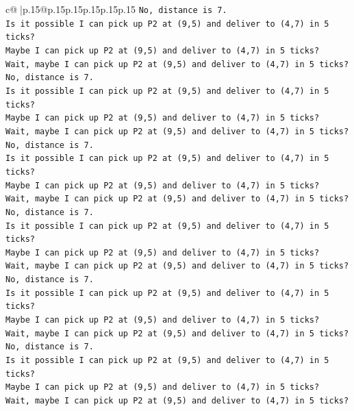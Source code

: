 \documentclass{article}
\begin{document}
{\begin{supertabular}{c@{$\;$}|p{.15\linewidth}@{}p{.15\linewidth}p{.15\linewidth}p{.15\linewidth}p{.15\linewidth}p{.15\linewidth}}
{{{\texttt{No, distance is 7.} \\
\texttt{Is it possible I can pick up P2 at (9,5) and deliver to (4,7) in 5 ticks?} \\
\texttt{Maybe I can pick up P2 at (9,5) and deliver to (4,7) in 5 ticks?} \\
\texttt{Wait, maybe I can pick up P2 at (9,5) and deliver to (4,7) in 5 ticks?} \\
\texttt{No, distance is 7.} \\
\texttt{Is it possible I can pick up P2 at (9,5) and deliver to (4,7) in 5 ticks?} \\
\texttt{Maybe I can pick up P2 at (9,5) and deliver to (4,7) in 5 ticks?} \\
\texttt{Wait, maybe I can pick up P2 at (9,5) and deliver to (4,7) in 5 ticks?} \\
\texttt{No, distance is 7.} \\
\texttt{Is it possible I can pick up P2 at (9,5) and deliver to (4,7) in 5 ticks?} \\
\texttt{Maybe I can pick up P2 at (9,5) and deliver to (4,7) in 5 ticks?} \\
\texttt{Wait, maybe I can pick up P2 at (9,5) and deliver to (4,7) in 5 ticks?} \\
\texttt{No, distance is 7.} \\
\texttt{Is it possible I can pick up P2 at (9,5) and deliver to (4,7) in 5 ticks?} \\
\texttt{Maybe I can pick up P2 at (9,5) and deliver to (4,7) in 5 ticks?} \\
\texttt{Wait, maybe I can pick up P2 at (9,5) and deliver to (4,7) in 5 ticks?} \\
\texttt{No, distance is 7.} \\
\texttt{Is it possible I can pick up P2 at (9,5) and deliver to (4,7) in 5 ticks?} \\
\texttt{Maybe I can pick up P2 at (9,5) and deliver to (4,7) in 5 ticks?} \\
\texttt{Wait, maybe I can pick up P2 at (9,5) and deliver to (4,7) in 5 ticks?} \\
\texttt{No, distance is 7.} \\
\texttt{Is it possible I can pick up P2 at (9,5) and deliver to (4,7) in 5 ticks?} \\
\texttt{Maybe I can pick up P2 at (9,5) and deliver to (4,7) in 5 ticks?} \\
\texttt{Wait, maybe I can pick up P2 at (9,5) and deliver to (4,7) in 5 ticks?} \\
}}}
\end{supertabular}}
\end{document}
